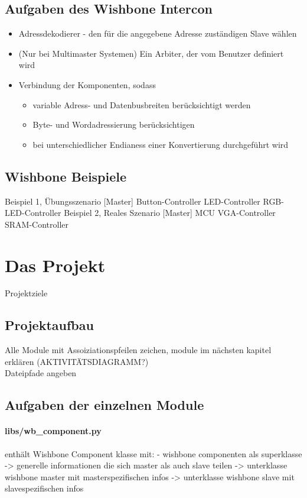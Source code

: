\documentclass{article}
\begin{document}
\subsection{Aufgaben des Wishbone Intercon}
\begin{itemize}
\item Adressdekodierer - den für die angegebene Adresse zuständigen Slave wählen
\item (Nur bei Multimaster Systemen) Ein Arbiter, der vom Benutzer definiert wird
\item Verbindung der Komponenten, sodass
\begin{itemize}
\item variable Adress- und Datenbusbreiten berücksichtigt werden
\item Byte- und Wordadressierung berücksichtigen
\item bei unterschiedlicher Endianess einer Konvertierung durchgeführt wird
\end{itemize}
\end{itemize}
\subsection{Wishbone Beispiele}
Beispiel 1, Übungsszenario
	[Master] Button-Controller \newline [Slave1] LED-Controller \newline [Slave2] RGB-LED-Controller
Beispiel 2, Reales Szenario
	[Master] MCU \newline [Slave1] VGA-Controller \newline [Slave2] SRAM-Controller
\section{Das Projekt}
Projektziele
\subsection{Projektaufbau}
Alle Module mit Assoiziationspfeilen zeichen, module im nächsten kapitel erklären (AKTIVITÄTSDIAGRAMM?)\\
Dateipfade angeben
\subsection{Aufgaben der einzelnen Module}
\paragraph{libs/wb\_component.py}
enthält Wishbone Component klasse mit:
- wishbone componenten als superklasse
-> generelle informationen die sich master als auch slave teilen
-> unterklasse wishbone master mit masterspezifischen infos
-> unterklasse wishbone slave mit slavespezifischen infos
\end{document}
